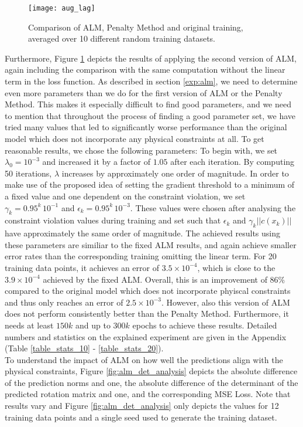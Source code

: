 \begin{figure}[H]
	\texttt{[image: aug\_lag]}
	\caption{Comparison of ALM, Penalty Method and original training, averaged over 10 different random training datasets.}
	\label{fig:aug_lag}
\end{figure}
Furthermore, Figure \ref{fig:aug_lag} depicts the results of applying the second version of ALM, again including the comparison with the same computation without the linear term in the loss function. As described in section \ref{exp:alm}, we need to determine even more parameters than we do for the first version of ALM or the Penalty Method. This makes it especially difficult to find good parameters, and we need to mention that throughout the process of finding a good parameter set, we have tried many values that led to significantly worse performance than the original model which does not incorporate any physical constraints at all. To get reasonable results, we chose the following parameters: To begin with, we set $\lambda_{0} = 10^{-3}$ and increased it by a factor of $1.05$ after each iteration. By computing 50 iterations, $\lambda$ increases by approximately one order of magnitude. In order to make use of the proposed idea of setting the gradient threshold to a minimum of a fixed value and one dependent on the constraint violation, we set $\gamma_k = 0.95^k\,10^{-1}$ and $\epsilon_k = 0.95^k\,10^{-3}$. These values were chosen after analysing the constraint violation values during training and set such that $\epsilon_k$ and $\gamma_k ||c(x_k)||$ have approximately the same order of magnitude. The achieved results using these parameters are similiar to the fixed ALM results, and again achieve smaller error rates than the corresponding training omitting the linear term. For 20 training data points, it achieves an error of $3.5\times 10^{-4}$, which is close to the $3.9 \times 10^{-4}$ achieved by the fixed ALM. Overall, this is an improvement of $86\%$ compared to the original model which does not incorporate phyiscal constraints and thus only reaches an error of $2.5\times 10^{-3}$. However, also this version of ALM does not perform consistently better than the Penalty Method. Furthermore, it needs at least $150k$ and up to $300k$ epochs to achieve these results. Detailed numbers and statistics on the explained experiment are given in the Appendix (Table \ref{table_stats_10} - \ref{table_stats_20}).\\
\indent To understand the impact of ALM on how well the predictions align with the physical constraints, Figure \ref{fig:alm_det_analysis} depicts the absolute difference of the prediction norms and one, the absolute difference of the determinant of the predicted rotation matrix and one, and the corresponding MSE Loss. Note that results vary and Figure \ref{fig:alm_det_analysis} only depicts the values for 12 training data points and a single seed used to generate the training dataset.

